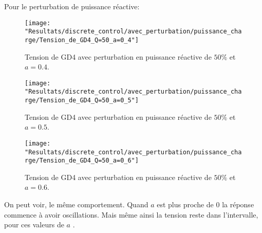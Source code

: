 Pour le perturbation de puissance réactive:

\begin{minipage}{.455\textwidth}
	\begin{figure}[H]
		\begin{center}
			\captionsetup{justification=centering,margin=.5cm}	
			\texttt{[image: "Resultats/discrete\_control/avec\_perturbation/puissance\_charge/Tension\_de\_GD4\_Q=50\_a=0\_4"]}
			\caption{Tension de GD4 avec perturbation en puissance réactive de $ 50\% $ et $ a =0.4$.}
			\label{fig:Tension_de_GD4_Q=50_a=0_4}
		\end{center}
	\end{figure}
\end{minipage}
\begin{minipage}{.455\textwidth}
	\begin{figure}[H]
		\begin{center}
			\captionsetup{justification=centering,margin=.5cm}	
			\texttt{[image: "Resultats/discrete\_control/avec\_perturbation/puissance\_charge/Tension\_de\_GD4\_Q=50\_a=0\_5"]}
			\caption{Tension de GD4 avec perturbation en puissance réactive de $ 50\% $ et $ a =0.5$.}
			\label{fig:Tension_de_GD4_Q=50_a=0_5}
		\end{center}
	\end{figure}
\end{minipage}
\begin{figure}[H]
	\begin{center}
		\captionsetup{justification=centering,margin=4.5cm}		
		\texttt{[image: "Resultats/discrete\_control/avec\_perturbation/puissance\_charge/Tension\_de\_GD4\_Q=50\_a=0\_6"]}
		\caption{Tension de GD4 avec perturbation en puissance réactive de $ 50\% $ et $ a =0.6$.}
		\label{fig:Tension_de_GD4_Q=50_a=0_6}
	\end{center}
\end{figure}

On peut voir, le même comportement. Quand $ a $ est plus proche de 0 la réponse commence à avoir oscillations. Mais même ainsi la tension reste dans l'intervalle, pour ces valeurs de $ a $ .
 														
 														
 
